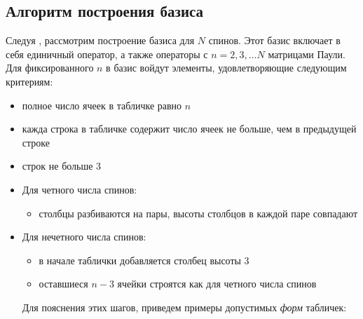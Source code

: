 \documentclass[]{article}
\renewcommand{\[}{\begin{equation}}
\renewcommand{\]}{\end{equation}}
\begin{document}
\subsection{Алгоритм построения базиса}

Следуя \cite{sourceArticle}, рассмотрим построение базиса для $N$ спинов. Этот базис включает в себя единичный оператор, а также операторы с $n=2,3,\dots N$ матрицами Паули. Для фиксированного $n$ в базис  войдут элементы, удовлетворяющие следующим критериям:
\begin{itemize}
    \item полное число ячеек в табличке равно $n$
	\item кажда строка в табличке содержит число ячеек не больше, чем в предыдущей строке
	\item строк не больше 3
	\item Для четного числа спинов:
	\begin{itemize}
		\item столбцы разбиваются на пары, высоты столбцов в каждой паре совпадают
	\end{itemize}
	\item Для нечетного числа спинов:
	\begin{itemize}
		\item в начале таблички добавляется столбец высоты 3
		\item оставшиеся $n-3$ ячейки строятся как для четного числа спинов
	\end{itemize}


Для пояснения этих шагов, приведем примеры допустимых {\it форм} табличек:
	

\end{itemize}
\end{document}
